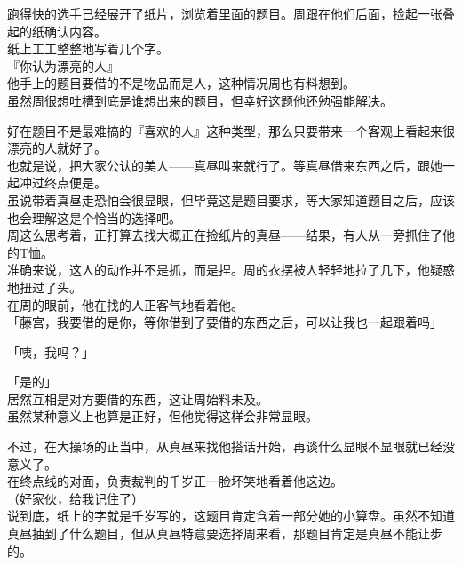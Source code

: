 跑得快的选手已经展开了纸片，浏览着里面的题目。周跟在他们后面，捡起一张叠起的纸确认内容。\\

纸上工工整整地写着几个字。\\

『你认为漂亮的人』\\

他手上的题目要借的不是物品而是人，这种情况周也有料想到。\\

虽然周很想吐槽到底是谁想出来的题目，但幸好这题他还勉强能解决。

好在题目不是最难搞的『喜欢的人』这种类型，那么只要带来一个客观上看起来很漂亮的人就好了。\\

也就是说，把大家公认的美人——真昼叫来就行了。等真昼借来东西之后，跟她一起冲过终点便是。\\

虽说带着真昼走恐怕会很显眼，但毕竟这是题目要求，等大家知道题目之后，应该也会理解这是个恰当的选择吧。\\

周这么思考着，正打算去找大概正在捡纸片的真昼——结果，有人从一旁抓住了他的T恤。\\

准确来说，这人的动作并不是抓，而是捏。周的衣摆被人轻轻地拉了几下，他疑惑地扭过了头。\\

在周的眼前，他在找的人正客气地看着他。\\

「藤宫，我要借的是你，等你借到了要借的东西之后，可以让我也一起跟着吗」

「咦，我吗？」

「是的」\\

居然互相是对方要借的东西，这让周始料未及。\\

虽然某种意义上也算是正好，但他觉得这样会非常显眼。

不过，在大操场的正当中，从真昼来找他搭话开始，再谈什么显眼不显眼就已经没意义了。\\

在终点线的对面，负责裁判的千岁正一脸坏笑地看着他这边。\\

（好家伙，给我记住了）\\

说到底，纸上的字就是千岁写的，这题目肯定含着一部分她的小算盘。虽然不知道真昼抽到了什么题目，但从真昼特意要选择周来看，那题目肯定是真昼不能让步的。\\

